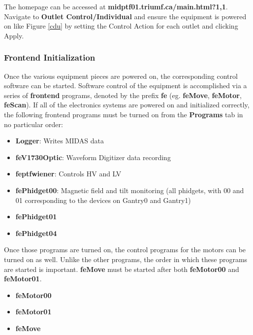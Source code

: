 \documentclass[twoside,letterpaper]{refart}
\begin{document}
The homepage can be accessed at \textbf{midptf01.triumf.ca/main.html?1,1}. Navigate to \textbf{Outlet Control/Individual} and ensure the equipment is powered on like Figure \ref{cdu} by setting the Control Action for each outlet and clicking Apply. 

\subsubsection{Frontend Initialization}

Once the various equipment pieces are powered on, the corresponding control software can be started.  Software control of the equipment is accomplished via a series of \textbf{frontend} programs, denoted by the prefix \textbf{fe} (eg. \textbf{feMove}, \textbf{feMotor}, \textbf{feScan}). If all of the electronics systems are powered on and initialized correctly, the following frontend programs must be turned on from the \textbf{Programs} tab in no particular order:

\begin{itemize}
	
	\item \textbf{Logger}:  Writes MIDAS data
	\item \textbf{feV1730Optic}:  Waveform Digitizer data recording
	\item \textbf{feptfwiener}:  Controls HV and LV
	\item \textbf{fePhidget00}:  Magnetic field and tilt monitoring (all phidgets, with 00 and 01 corresponding to the devices on Gantry0 and Gantry1)
	\item \textbf{fePhidget01}
	\item \textbf{fePhidget04}
	
\end{itemize}

Once those programs are turned on, the control programs for the motors can be turned on as well. Unlike the other programs, the order in which these programs are started is important.  \textbf{feMove} must be started after both \textbf{feMotor00} and \textbf{feMotor01}.

\begin{itemize}
	
	\item \textbf{feMotor00}
	\item \textbf{feMotor01}
	\item \textbf{feMove}
	
\end{itemize}
\end{document}
